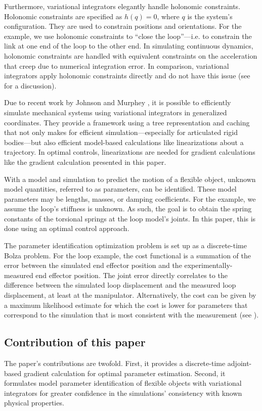 \documentclass[letterpaper, 10pt, conference]{ieeeconf}
\begin{document}
Furthermore, variational integrators elegantly handle holonomic constraints.  Holonomic constraints are specified as $h(q) = 0$, where $q$ is the system's configuration.  They are used to constrain positions and orientations.  For the example, we use holonomic constraints to ``close the loop''---i.e. to constrain the link at one end of the loop to the other end.  In simulating continuous dynamics, holonomic constraints are handled with equivalent constraints on the acceleration that creep due to numerical integration error.  In comparison, variational integrators apply holonomic constraints directly and do not have this issue (see \cite{johnson_murphey_scalable} for a discussion).

Due to recent work by Johnson and Murphey \cite{johnson_murphey_scalable, johnson_murphey_linearization}, it is possible to efficiently simulate mechanical systems using variational integrators in generalized coordinates. They provide a framework using a tree representation and caching that not only makes for efficient simulation---especially for articulated rigid bodies---but also efficient model-based calculations like linearizations about a trajectory.   In optimal controls, linearizations are needed for gradient calculations like the gradient calculation presented in this paper. 

With a model and simulation to predict the motion of a flexible object, unknown model quantities, referred to as parameters, can be identified.  These model parameters may be lengths, masses, or damping coefficients.  For the example, we assume the loop's stiffness is unknown.  As such, the goal is to obtain the spring constants of the torsional springs at the loop model's joints.  In this paper, this is done using an optimal control approach.

The parameter identification optimization problem is set up as a discrete-time Bolza problem.  For the loop example, the cost functional is a summation of the error between the simulated end effector position and the experimentally-measured end effector position.  The joint error directly correlates to the difference between the simulated loop displacement and the measured loop displacement, at least at the manipulator.  Alternatively, the cost can be given by a maximum likelihood estimate for which the cost is lower for parameters that correspond to the simulation that is most consistent with the measurement (see \cite{houska_etal}).  

\subsection{Contribution of this paper}
The paper's contributions are twofold.  First, it provides a discrete-time adjoint-based gradient calculation for optimal parameter estimation.  Second, it formulates model parameter identification of flexible objects with variational integrators for greater confidence in the simulations' consistency with known physical properties.
\end{document}
